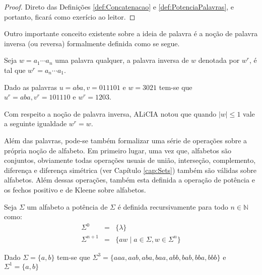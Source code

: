 \begin{proof}
	Direto das Definições \ref{def:Concatenacao} e \ref{def:PotenciaPalavras}, e portanto, ficará como exerício ao leitor.
\end{proof}

Outro importante conceito existente sobre a ideia de palavra é a noção de palavra inversa (ou reversa) formalmente definida como se segue.

\begin{definicao}\label{def:PalavraInversa}
	\cite{valdi2016master} Seja $w = a_1\cdots a_n$ uma palavra qualquer, a palavra inversa de $w$ denotada por $w^r$, é tal que $w^r = a_n\cdots a_1$. 
\end{definicao}

\begin{exemplo}
	Dado as palavras $u = aba, v = 011101$ e $w = 3021$ tem-se que $u^r = aba, v^r = 101110$ e $w^r = 1203$.
\end{exemplo}

\begin{dica}
  Com respeito a noção de palavra inversa, ALiCIA notou que quando $|w| \leq 1$ vale a seguinte igualdade $w^r = w$.
\end{dica}

Além das palavras, pode-se também formalizar uma série de operações sobre a própria noção de alfabeto. Em primeiro lugar, uma vez que,  alfabetos são conjuntos, obviamente todas operações usuais de união, interseção, complemento, diferença e diferença simétrica (ver Capítulo \ref{cap:Sets}) também são válidas sobre alfabetos. Além dessas operações, também esta definida a operação de potência e os fechos positivo e de Kleene sobre alfabetos.

\begin{definicao}\label{def:PotenciaAlfabeto}
	\cite{benjaLivro2010} Seja $\Sigma$ um alfabeto a potência de $\Sigma$ é definida recursivamente para todo $n \in \mathbb{N}$ como:
	\begin{eqnarray}
		\Sigma^0 & = & \{\lambda\}\\
		\Sigma^{n+1} & = & \{aw \mid a \in \Sigma, w \in \Sigma^{n}\}
	\end{eqnarray}
\end{definicao}

\begin{exemplo}
	Dado $\Sigma = \{a, b\}$ tem-se que $\Sigma^3 = \{aaa, aab, aba, baa, abb, bab, bba, bbb\}$ e $\Sigma^1 = \{a, b\}$
\end{exemplo}

